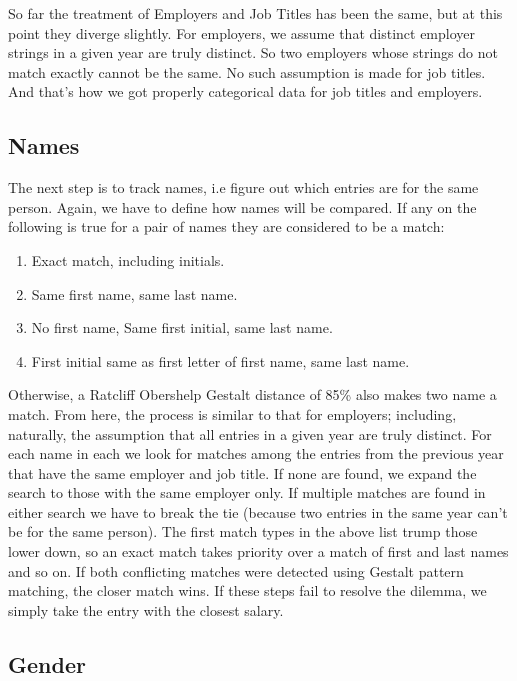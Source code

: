 \documentclass{article}
\begin{document}
So far the treatment of Employers and Job Titles has been the same, but at this
point they diverge slightly.  For employers, we assume that distinct employer
strings in a given year are truly distinct. So two employers whose strings do
not match exactly cannot be the same.  No such assumption is made for job
titles. And that's how we got properly categorical data for job titles and
employers.

\subsection{Names}

The next step is to track names, i.e figure out which entries are for the same
person. Again, we have to define how names will be compared. If any on the
following is true for a pair of names they are considered to be a match:

\begin{enumerate}
    \item Exact match, including initials.
    \item Same first name, same last name.
    \item No first name, Same first initial, same last name.
    \item First initial same as first letter of first name, same last name.
\end{enumerate}

Otherwise, a Ratcliff Obershelp Gestalt distance of 85\% also makes two
name a match.  From here, the process is similar to that for employers;
including, naturally, the assumption that all entries in a given year are truly
distinct. For each name in each we look for matches among the entries from the
previous year that have the same employer and job title.  If none are found, we
expand the search to those with the same employer only. If multiple matches are
found in either search we have to break the tie (because two entries in the
same year can't be for the same person). The first match types in the above
list trump those lower down, so an exact match takes priority over a match of first
and last names and so on. If both conflicting matches were detected using Gestalt 
pattern matching, the closer match wins. If these steps fail to resolve the dilemma,
we simply take the entry with the closest salary.

\subsection{Gender}
\end{document}
